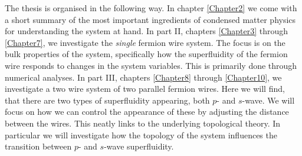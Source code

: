 The thesis is organised in the following way. In chapter \ref{Chapter2} we come with a short summary of the most important ingredients of condensed matter physics for understanding the system at hand. In part II, chapters \ref{Chapter3} through \ref{Chapter7}, we investigate the \textit{single} fermion wire system. The focus is on the bulk properties of the system, specifically how the superfluidity of the fermion wire responds to changes in the system variables. This is primarily done through numerical analyses. In part III, chapters \ref{Chapter8} through \ref{Chapter10}, we investigate a two wire system of two parallel fermion wires. Here we will find, that there are two types of superfluidity appearing, both $p$- and $s$-wave. We will focus on how we can control the appearance of these by adjusting the distance between the wires. This neatly links to the underlying topological theory. In particular we will investigate how the topology of the system influences the transition between $p$- and $s$-wave superfluidity.   